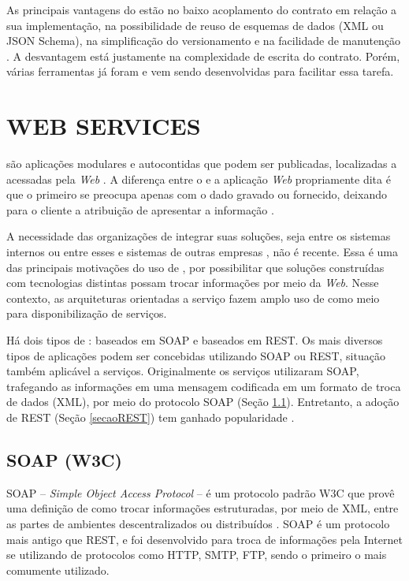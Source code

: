 As principais vantagens do \CtFirst{} estão no baixo acoplamento do contrato em
relação a sua implementação, na possibilidade de reuso de esquemas de dados (XML
ou JSON Schema), na simplificação do versionamento e na facilidade de manutenção
\cite{karthikeyancontract}. A desvantagem está justamente na complexidade de
escrita do contrato. Porém, várias ferramentas já foram e vem sendo
desenvolvidas para facilitar essa tarefa.


\section{WEB SERVICES}
\vspace{-6mm}

\ws{} são aplicações modulares e autocontidas que podem ser publicadas,
localizadas a acessadas pela \textit{Web} \cite{alonso2004web}. A diferença
entre o \ws{} e a aplicação \textit{Web} propriamente dita é que o primeiro se
preocupa apenas com o dado gravado ou fornecido, deixando para o cliente a atribuição de apresentar a
informação \cite{serrano2014service}.

A necessidade das organizações de integrar suas soluções, seja
entre os sistemas internos ou entre esses e sistemas de outras empresas
\cite{rao2004survey}, não é recente. Essa é uma das principais motivações do uso
de \ws{}, por possibilitar que soluções construídas com tecnologias distintas
possam trocar informações por meio da \textit{Web}. Nesse contexto, as arquiteturas
orientadas a serviço fazem amplo uso de \ws{} como meio para disponibilização de serviços.

Há dois tipos de \ws{}: baseados em SOAP e baseados em REST. Os mais diversos
tipos de aplicações podem ser concebidas utilizando \wss{} SOAP ou REST,
situação também aplicável a serviços.
Originalmente os serviços utilizaram \ws{} SOAP, trafegando as informações em
uma mensagem codificada em um formato de troca de dados (XML), por meio do
protocolo SOAP (Seção \ref{secaoSOAP}). Entretanto, a adoção de \ws{} REST
(Seção \ref{secaoREST}) tem ganhado popularidade \cite{mumbaikar2013web}.

\subsection{SOAP (W3C) }
\label{secaoSOAP}
\vspace{-6mm}

SOAP -- \textit{Simple Object Access Protocol} -- é um protocolo padrão W3C que
provê uma definição de como trocar informações estruturadas, por meio de XML, entre
as partes de ambientes descentralizados ou distribuídos \cite{WSDLSite}. SOAP
é um protocolo mais antigo que REST, e foi desenvolvido para troca de informações
pela Internet se utilizando de protocolos como HTTP, SMTP, FTP, sendo o primeiro
o mais comumente utilizado.

